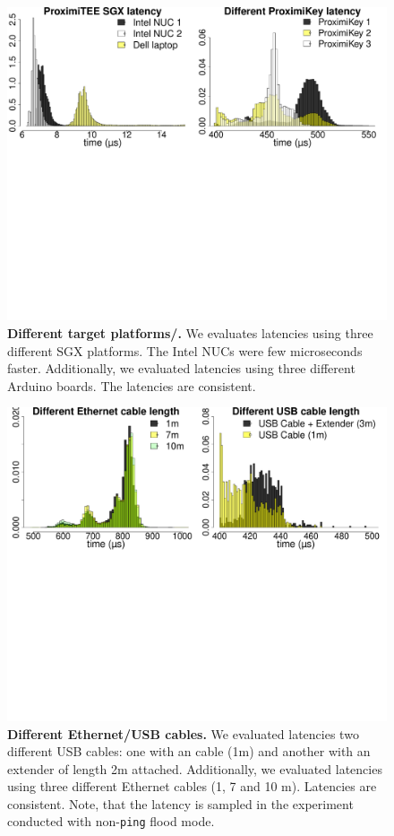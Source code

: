 \begin{figure}[t]
  \centering
    \includegraphics[trim={0 18cm 0 0}, clip, width=\linewidth]{chapters/ProximiTEE/data/graph/PlatformDevice_1.pdf}
    \caption{\textbf{Different target platforms/\device.} We evaluates latencies using three different SGX platforms. The Intel NUCs were few microseconds faster. Additionally, we evaluated latencies using three different Arduino boards. The latencies are consistent.}
    \label{graph:sgxLatency}
\end{figure}

\begin{figure}[t]
  \centering
    \includegraphics[trim={0 18cm 0 0}, clip, width=\linewidth]{chapters/ProximiTEE/data/graph/CombinedCable_1.pdf}
    \caption{\textbf{Different Ethernet/USB cables.} We evaluated latencies two different USB cables: one with an \usb cable (1m) and another with an \usb extender of length 2m attached. Additionally, we evaluated latencies using three different Ethernet cables (1, 7 and 10 m). Latencies are consistent. Note, that the latency is sampled in the experiment conducted with non-\texttt{ping} flood mode.}
    \label{graph:usbCableLength}
\end{figure}


